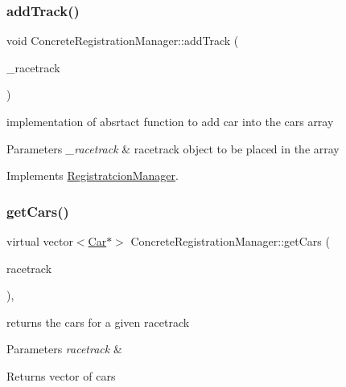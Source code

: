 \subsubsection{\texorpdfstring{add\+Track()}{addTrack()}}
{\footnotesize\ttfamily void Concrete\+Registration\+Manager\+::add\+Track (\begin{DoxyParamCaption}\item[{\mbox{\hyperlink{class_race_track_component}{Race\+Track\+Component}} $\ast$}]{\+\_\+racetrack }\end{DoxyParamCaption})\hspace{0.3cm}{\ttfamily [virtual]}}

implementation of absrtact function to add car into the cars array 
\begin{DoxyParams}{Parameters}
{\em \+\_\+racetrack} & racetrack object to be placed in the array \\
\hline
\end{DoxyParams}


Implements \mbox{\hyperlink{class_registratcion_manager_a7008cf3cb173f6121f94784ed242a7c6}{Registratcion\+Manager}}.

\mbox{\label{class_concrete_registration_manager_acea73f6efa6ec01052d3d43694405e66}} 
\subsubsection{\texorpdfstring{get\+Cars()}{getCars()}}
{\footnotesize\ttfamily virtual vector$<$\mbox{\hyperlink{class_car}{Car}}$\ast$$>$ Concrete\+Registration\+Manager\+::get\+Cars (\begin{DoxyParamCaption}\item[{int}]{racetrack }\end{DoxyParamCaption})\hspace{0.3cm}{\ttfamily [inline]}, {\ttfamily [virtual]}}

returns the cars for a given racetrack 
\begin{DoxyParams}{Parameters}
{\em racetrack} & \\
\hline
\end{DoxyParams}
\begin{DoxyReturn}{Returns}
vector of cars 
\end{DoxyReturn}


